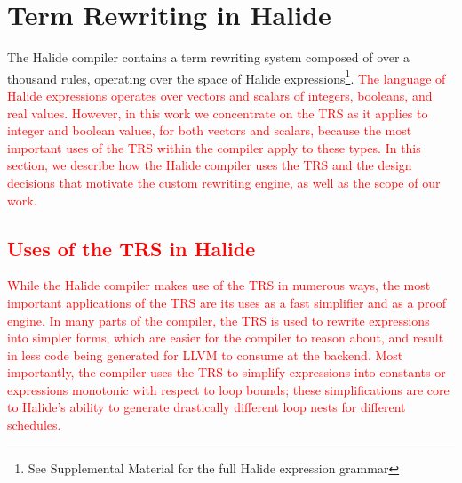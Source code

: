 \documentclass[acmsmall,review]{acmart}\settopmatter{printfolios=true,printccs=false,printacmref=false}
\newcommand{\modified}[1]{\textcolor{red}{{#1}}}
\begin{document}
\section{Term Rewriting in Halide}
\label{sec:term-rewriting-in-halide}
The Halide compiler contains a term rewriting system composed of over a thousand
rules, operating over the space of Halide expressions\footnote{See Supplemental Material for
the full Halide expression grammar}.  \modified{The language of Halide expressions
operates over vectors and scalars of integers, booleans, and real values.  However, in
this work we concentrate on the TRS as it applies to integer and boolean values, for
both vectors and scalars, because the most important uses of the TRS within the compiler
apply to these types.  In this section, we describe how the Halide compiler uses the TRS
and the design decisions that motivate the custom rewriting engine, as well as the scope
of our work.}

\subsection{\modified{Uses of the TRS in Halide}}
\label{sec:uses-of-trs}
\modified{While the Halide compiler makes use of the TRS in numerous ways, the most important
  applications of the TRS are its uses as a fast simplifier and as a proof engine.  
  In many parts of the compiler, the TRS is used to rewrite expressions into simpler forms,
  which are easier for the compiler to reason about, and result in less code being generated for
  LLVM to consume at the backend.  Most importantly, the compiler uses the TRS to simplify expressions
  into constants or expressions monotonic with respect to loop bounds; these simplifications are core to Halide's
  ability to generate drastically different loop nests for different schedules.}
\end{document}
